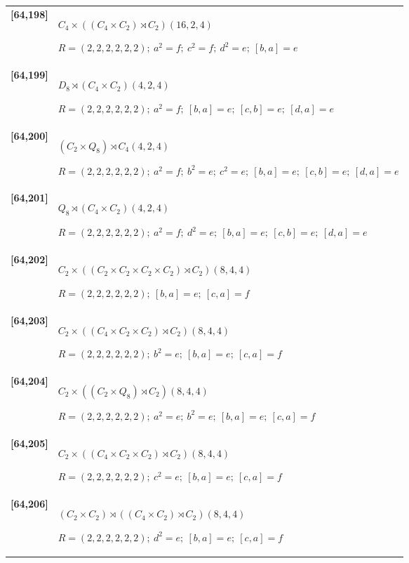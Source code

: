 \documentclass[UTF8,fontset=fandol,11pt,a4paper]{ctexart}
\begin{document}
\begin{longtable}{@{}p{17mm}>{\raggedright\arraybackslash}p{141mm}@{}}
\textbf{[64,198]} & $C_{4}\times ((C_{4}\times C_{2})\rtimes C_{2})$\quad $(16,2,4)$\par\(R=(2,2,2,2,2,2);\allowbreak\ a^{2}=f;\allowbreak\ c^{2}=f;\allowbreak\ d^{2}=e;\allowbreak\ [b,a]=e\)\\[3pt]

\textbf{[64,199]} & $D_{8}\rtimes (C_{4}\times C_{2})$\quad $(4,2,4)$\par\(R=(2,2,2,2,2,2);\allowbreak\ a^{2}=f;\allowbreak\ [b,a]=e;\allowbreak\ [c,b]=e;\allowbreak\ [d,a]=e\)\\[3pt]

\textbf{[64,200]} & $(C_{2}\times Q_{8})\rtimes C_{4}$\quad $(4,2,4)$\par\(R=(2,2,2,2,2,2);\allowbreak\ a^{2}=f;\allowbreak\ b^{2}=e;\allowbreak\ c^{2}=e;\allowbreak\ [b,a]=e;\allowbreak\ [c,b]=e;\allowbreak\ [d,a]=e\)\\[3pt]

\textbf{[64,201]} & $Q_{8}\rtimes (C_{4}\times C_{2})$\quad $(4,2,4)$\par\(R=(2,2,2,2,2,2);\allowbreak\ a^{2}=f;\allowbreak\ d^{2}=e;\allowbreak\ [b,a]=e;\allowbreak\ [c,b]=e;\allowbreak\ [d,a]=e\)\\[3pt]

\textbf{[64,202]} & $C_{2}\times ((C_{2}\times C_{2}\times C_{2}\times C_{2})\rtimes C_{2})$\quad $(8,4,4)$\par\(R=(2,2,2,2,2,2);\allowbreak\ [b,a]=e;\allowbreak\ [c,a]=f\)\\[3pt]

\textbf{[64,203]} & $C_{2}\times ((C_{4}\times C_{2}\times C_{2})\rtimes C_{2})$\quad $(8,4,4)$\par\(R=(2,2,2,2,2,2);\allowbreak\ b^{2}=e;\allowbreak\ [b,a]=e;\allowbreak\ [c,a]=f\)\\[3pt]

\textbf{[64,204]} & $C_{2}\times ((C_{2}\times Q_{8})\rtimes C_{2})$\quad $(8,4,4)$\par\(R=(2,2,2,2,2,2);\allowbreak\ a^{2}=e;\allowbreak\ b^{2}=e;\allowbreak\ [b,a]=e;\allowbreak\ [c,a]=f\)\\[3pt]

\textbf{[64,205]} & $C_{2}\times ((C_{4}\times C_{2}\times C_{2})\rtimes C_{2})$\quad $(8,4,4)$\par\(R=(2,2,2,2,2,2);\allowbreak\ c^{2}=e;\allowbreak\ [b,a]=e;\allowbreak\ [c,a]=f\)\\[3pt]

\textbf{[64,206]} & $(C_{2}\times C_{2})\rtimes ((C_{4}\times C_{2})\rtimes C_{2})$\quad $(8,4,4)$\par\(R=(2,2,2,2,2,2);\allowbreak\ d^{2}=e;\allowbreak\ [b,a]=e;\allowbreak\ [c,a]=f\)\\[3pt]


\end{longtable}
\end{document}
